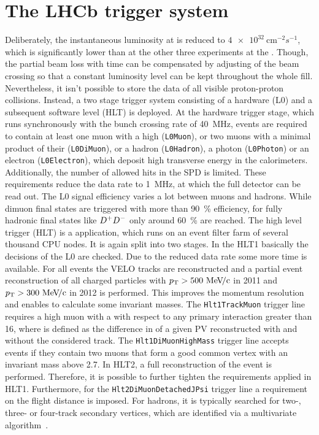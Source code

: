 
\section{The LHCb trigger system}
\label{sec:detector:trigger}

Deliberately, the instantaneous luminosity at \lhcb is reduced to
$\SI{4e32}{\cm^{-2}s^{-1}}$, which is significantly lower than at the other
three experiments at the \lhc. Though, the partial beam loss with time can be
compensated by adjusting of the beam crossing so that a constant luminosity
level can be kept throughout the whole fill. Nevertheless, it isn't possible
to store the data of all visible proton-proton collisions. Instead, a two
stage trigger system consisting of a hardware (L0) and a subsequent software
level (HLT) is deployed. At the hardware trigger stage, which runs
synchronously with the bunch crossing rate of \SI{40}{\mega\hertz}, events are
required to contain at least one muon with a high \pt (\texttt{L0Muon}), or
two muons with a minimal product of their \pT (\texttt{L0DiMuon}), or a hadron
(\texttt{L0Hadron}), a photon (\texttt{L0Photon}) or an electron
(\texttt{L0Electron}), which deposit high transverse energy in the
calorimeters. Additionally, the number of allowed hits in the SPD is limited.
These requirements reduce the data rate to \SI{1}{\mega\hertz}, at which the
full detector can be read out. The L0 signal efficiency varies a lot between
muons and hadrons. While dimuon final states are triggered with more than
\SI{90}{\percent} efficiency, for fully hadronic final states like ${{D}^+}{{D}^-}$
only around \SI{60}{\percent} are reached. The high level trigger (HLT) is a
\cpp application, which runs on an event filter farm of several thousand CPU
nodes. It is again split into two stages. In the HLT1 basically the decisions
of the L0 are checked. Due to the reduced data rate some more time is
available. For all events the VELO tracks are reconstructed and a partial
event reconstruction of all charged particles with $\mbox{$p_{\mathrm{ T}}$} > \SI{500}{\ensuremath{{\mathrm{\,Me\kern -0.1em V\!/}c}}}$ in
2011 and $\mbox{$p_{\mathrm{ T}}$} > \SI{300}{\ensuremath{{\mathrm{\,Me\kern -0.1em V\!/}c}}}$ in 2012 is performed. This improves the
momentum resolution and enables to calculate some invariant masses. The
\texttt{Hlt1TrackMuon} trigger line requires a high \pt muon with a \chisqip
with respect to any primary interaction greater than 16, where \chisqip is
defined as the difference in \chisq of a given PV reconstructed with and
without the considered track. %
The \texttt{Hlt1DiMuonHighMass} trigger line accepts events if they contain
two muons that form a good common vertex with an invariant mass above
\SI{2.7}{\gevcc}. In HLT2, a full reconstruction of the event is performed.
Therefore, it is possible to further tighten the requirements applied in HLT1.
Furthermore, for the \texttt{Hlt2DiMuonDetachedJPsi} trigger line a
requirement on the flight distance is imposed. For hadrons, it is typically
searched for two-, three- or four-track secondary vertices, which are
identified via a multivariate algorithm~\cite{BBDT}.

